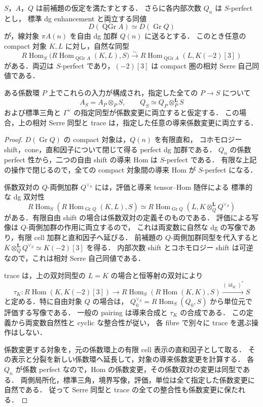 \begin{theorem}
\label{thm:relative-serre-localization-criterion}
$S$，$A$，$Q$ は前補題の仮定を満たすとする．
さらに各内部次数 $Q_n$ は $S$-perfect とし，
標準 dg enhancement と両立する同値
\[
 D(\operatorname{QGr}A)\simeq D(\operatorname{Gr}Q)
\]
が，線対象 $\pi A(n)$ を自由 dg 加群 $Q(n)$ に送るとする．
このとき任意の compact 対象 $K,L$ に対し，自然な同型
\begin{equation}\label{eq:relative-serre-localization-formula}
 R\operatorname{Hom}_S
 \bigl(R\operatorname{Hom}_{\operatorname{QGr}A}(K,L),S\bigr)
 \xrightarrow{\sim}
 R\operatorname{Hom}_{\operatorname{QGr}A}(L,K(-2)[3])
\end{equation}
がある．両辺は $S$-perfect であり，$(-2)[3]$ は compact 圏の相対 Serre 自己同値である．

ある係数環 $P$ 上でこれらの入力が構成され，指定した全ての $P\to S$ について
\[
 A_S=A_P\otimes_PS,
 \qquad Q_S\simeq Q_P\otimes_P^{\mathbf L}S
\]
および標準三角と $\Gamma^{\vee}$ の指定同型が係数変更に両立すると仮定する．
この場合，上の相対 Serre 同型と trace は，指定した任意の導来係数変更に両立する．
\end{theorem}

\begin{proof}
$D(\operatorname{Gr}Q)$ の compact 対象は，$Q(n)$ を有限直和，
コホモロジー shift，cone，直和因子について閉じて得る perfect dg 加群である．
$Q_n$ の係数 perfect 性から，二つの自由 shift の導来 Hom は $S$-perfect である．
有限な上記の操作で閉じるので，全ての compact 対象間の導来 Hom が $S$-perfect になる．

係数双対の $Q$-両側加群 $Q^{\vee_S}$ には，評価と導来 tensor--Hom 随伴による
標準的な dg 双対性
\[
 R\operatorname{Hom}_S(R\operatorname{Hom}_{\operatorname{Gr}Q}(K,L),S)
 \simeq
 R\operatorname{Hom}_{\operatorname{Gr}Q}
 (L,K\otimes_Q^{\mathbf L}Q^{\vee_S})
\]
がある．有限自由 shift の場合は係数双対の定義そのものである．
評価による写像は $Q$-両側加群の作用に両立するので，
これは両変数に自然な dg の写像であり，有限 cell 加群と直和因子へ延びる．
前補題の $Q$-両側加群同型を代入すると
$K\otimes_Q^{\mathbf L}Q^{\vee_S}\simeq K(-2)[3]$ を得る．
内部次数 shift とコホモロジー shift は可逆なので，これは相対 Serre 自己同値である．

trace は，上の双対同型の $L=K$ の場合と恒等射の双対により
\[
 \tau_K:R\operatorname{Hom}(K,K(-2)[3])
 \longrightarrow R\operatorname{Hom}_S(R\operatorname{Hom}(K,K),S)
 \xrightarrow{(\operatorname{id}_K)^*}S
\]
と定める．特に自由対象 $Q$ の場合は，
$Q^{\vee_S}_0=R\operatorname{Hom}_S(Q_0,S)$ から単位元で評価する写像である．
一般の pairing は導来合成と $\tau_K$ の合成である．
この定義から両変数自然性と cyclic な整合性が従い，
各 fibre で別々に trace を選ぶ操作はしない．

係数変更する対象を，元の係数環上の有限 cell 表示の直和因子として取る．
その表示と分裂を新しい係数環へ延長して，対象の導来係数変更を計算する．
各 $Q_n$ が係数 perfect なので，Hom の係数変更，その係数双対の変更は同型である．
両側局所化，標準三角，境界写像，評価，単位は全て指定した係数変更に自然である．
従って Serre 同型と trace の全ての整合性も係数変更に保たれる．
\end{proof}


